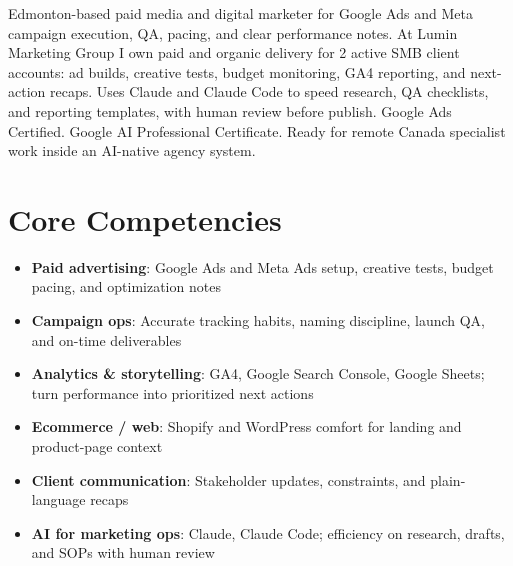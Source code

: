 \documentclass[11pt,a4paper,sans]{moderncv}
\begin{document}
\makecvtitle

\vspace{6pt}
\small{Edmonton-based paid media and digital marketer for Google Ads and Meta campaign execution, QA, pacing, and clear performance notes. At Lumin Marketing Group I own paid and organic delivery for 2 active SMB client accounts: ad builds, creative tests, budget monitoring, GA4 reporting, and next-action recaps. Uses Claude and Claude Code to speed research, QA checklists, and reporting templates, with human review before publish. Google Ads Certified. Google AI Professional Certificate. Ready for remote Canada specialist work inside an AI-native agency system.}

\section{Core Competencies}
\vspace{1pt}
\begin{itemize}
\item \textbf{Paid advertising}: Google Ads and Meta Ads setup, creative tests, budget pacing, and optimization notes
\item \textbf{Campaign ops}: Accurate tracking habits, naming discipline, launch QA, and on-time deliverables
\item \textbf{Analytics \& storytelling}: GA4, Google Search Console, Google Sheets; turn performance into prioritized next actions
\item \textbf{Ecommerce / web}: Shopify and WordPress comfort for landing and product-page context
\item \textbf{Client communication}: Stakeholder updates, constraints, and plain-language recaps
\item \textbf{AI for marketing ops}: Claude, Claude Code; efficiency on research, drafts, and SOPs with human review
\end{itemize}
\end{document}
